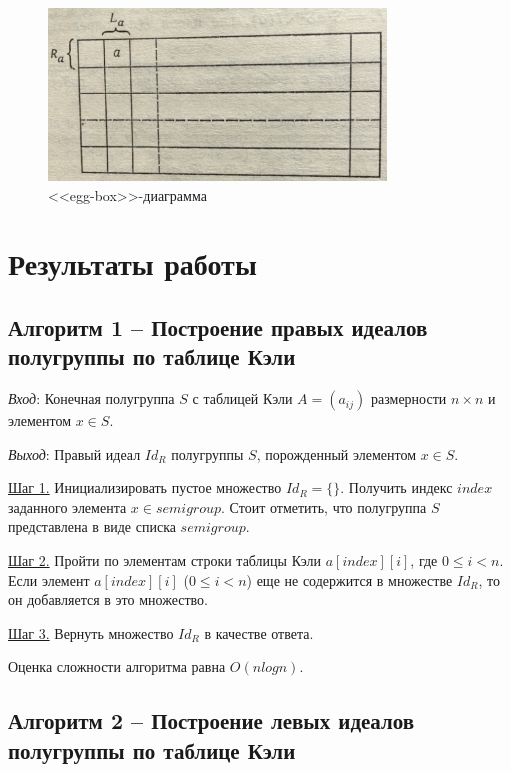 \documentclass[spec, och, labwork]{shiza}
\begin{document}
      \begin{figure}[H]
        \centering
        \includegraphics[width=0.8\textwidth]{pic/egg-box.png}
        \caption{<<egg-box>>-диаграмма}
      \end{figure}

      \section{Результаты работы}
      \subsection{Алгоритм 1 -- Построение правых идеалов полугруппы по таблице Кэли}
  
      \textit{Вход}: Конечная полугруппа $S$ с таблицей Кэли $A = (a_{ij})$ размерности $n \times n$ и элементом $x \in S$.
  
      \textit{Выход}: Правый идеал $Id_R$ полугруппы $S$, порожденный элементом $x \in S$.
      
      \underline{Шаг 1.} Инициализировать пустое множество $Id_R = \{\}$. Получить индекс $index$ заданного элемента $x \in semigroup$.
      Стоит отметить, что полугруппа $S$ представлена в виде списка $semigroup$.
      
      \underline{Шаг 2.} Пройти по элементам строки таблицы Кэли $a[index][i]$, где $0 \leq i < n$. Если элемент $a[index][i]$ ($0 \leq i < n$) еще не содержится
      в множестве $Id_R$, то он добавляется в это множество.
      
      \underline{Шаг 3.} Вернуть множество $Id_R$ в качестве ответа.
      
        Оценка сложности алгоритма равна $O(nlog n)$.
  
        \subsection{Алгоритм 2 -- Построение левых идеалов полугруппы по таблице Кэли}
  
\end{document}
